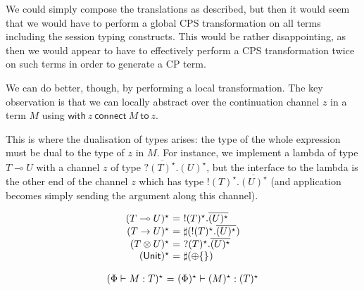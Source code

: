 \documentclass{easychair}
\makeatletter
\newcommand{\ba}{\begin{array}}
\newcommand{\ea}{\end{array}}
\newenvironment{equations}{\[\ba{@{}r@{~}c@{~}l@{}}}{\ea\]}
\newcommand{\key}{\mathsf}
\newcommand{\set}[1]{\{ #1 \}}
\newcommand{\row}[2]{\set{#1}_{#2}}
\newcommand{\gvOutput}[2]{\mathord{!}{#1}.{#2}}
\newcommand{\gvInput}[2]{\mathord{?}{#1}.{#2}}
\newcommand{\gvPlus}[2]{\oplus \row{#1}{#2}}
\newcommand{\gvService}[1]{\sharp {#1}}
\newcommand{\gvDual}[1]{\overline{#1}}
\newcommand{\gvj}[3]{{#1} \vdash {#2} : {#3}}
\newcommand{\lolli}{\multimap}
\newcommand{\gvLinFun}[2]{{#1} \lolli {#2}}
\newcommand{\gvUnFun}[2]{{#1} \to {#2}}
\newcommand{\gvTimes}[2]{{#1} \otimes {#2}}
\newcommand{\gvUnitType}{\key{Unit}}
\newcommand{\gvWith}[3]{\key{with}~{#1}~\key{connect}~{#2}~\key{to}~{#3}}
\makeatother
\begin{document}


We could simply compose the translations as described, but then it
would seem that we would have to perform a global CPS transformation
on all terms including the session typing constructs. This would be
rather disappointing, as then we would appear to have to effectively
perform a CPS transformation twice on such terms in order to generate
a CP term.

\newcommand{\gvtogv}[1]{({#1})^\star}

We can do better, though, by performing a local transformation. The
key observation is that we can locally abstract over the continuation
channel $z$ in a term $M$ using $\gvWith{z}{M}{z}$.

This is where the dualisation of types arises: the type of the whole
expression must be dual to the type of $z$ in $M$. For instance, we
implement a lambda of type $\gvLinFun{T}{U}$ with a channel $z$ of
type $\gvInput{\gvDual{\gvtogv{T}}}{\gvtogv{U}}$, but the interface to
the lambda is the other end of the channel $z$ which has type
$\gvOutput{\gvtogv{T}}{\gvDual{\gvtogv{U}}}$ (and application becomes
simply sending the argument along this channel).

\begin{equations}
\gvtogv{\gvLinFun{T}{U}} &=& \gvOutput{\gvtogv{T}}{\gvDual{\gvtogv{U}}} \\
\gvtogv{\gvUnFun{T}{U}} &=& \gvService{(\gvOutput{\gvtogv{T}}{\gvDual{\gvtogv{U}}})} \\
\gvtogv{\gvTimes{T}{U}} &=& \gvInput{\gvtogv{T}}{\gvDual{\gvtogv{U}}} \\
\gvtogv{\gvUnitType} &=& \gvService{(\gvPlus{}{})} \\
\end{equations}%

\begin{equations}
\gvtogv{\gvj{\Phi}{M}{T}} &=& \gvj{\gvtogv{\Phi}}{\gvtogv{M}}{\gvtogv{T}} \\
\end{equations}%
\end{document}
